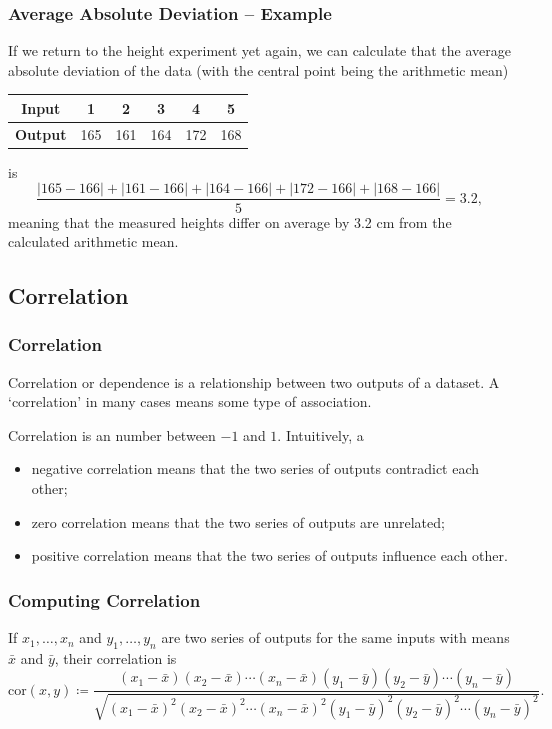 \documentclass[aspectratio=169,11pt,svgnames,handout]{beamer}
\begin{document}
\begin{frame}
 \frametitle{Average Absolute Deviation -- Example}
 If we return to the height experiment yet again, we can calculate that the
 average absolute deviation of the data (with the central point being the
 arithmetic mean)
 \begin{center}
  \begin{tabular}{c|ccccc}
   \textbf{Input} & 1 & 2 & 3 & 4 & 5\\
   \midrule
   \textbf{Output} & 165 & 161 & 164 & 172 & 168
  \end{tabular}
 \end{center}
 \pause
 is
 \[
  \frac{|165 - 166| + |161 - 166| + |164 - 166| + |172 - 166| + |168 - 166|}{5}
  = 3.2,
 \]
 \pause
 meaning that the measured heights differ on average by 3.2 cm from the
 calculated arithmetic mean.
\end{frame}

\subsection{Correlation}
\begin{frame}
 \frametitle{}
 \subsectionpage
\end{frame}

\begin{frame}
 \frametitle{Correlation}
 \begin{tcolorbox}[title=Correlation]
  \alert{Correlation} or \alert{dependence} is a relationship between two
  outputs of a dataset. A `correlation' in many cases means some type of
  association.
 \end{tcolorbox}
 \pause
 Correlation is an number between $-1$ and $1$.
 \pause
 Intuitively, a
 \begin{itemize}[label=\textbullet]
  \item negative correlation means that the two series of outputs
   \alert{contradict} each other;
  \pause
  \item zero correlation means that the two series of outputs are
   \alert{unrelated};
  \pause
  \item positive correlation means that the two series of outputs
   \alert{influence} each other.
 \end{itemize}
\end{frame}

\begin{frame}
 \frametitle{Computing Correlation}
 \begin{tcolorbox}[title=Correlation Formula]
  If $x_1,\ldots,x_n$ and $y_1,\ldots,y_n$ are two series of outputs for the
  same inputs with means $\bar{x}$ and $\bar{y}$, their correlation is
  \[
   \mathrm{cor}(x,y) \coloneqq \frac{(x_1-\bar{x})(x_2-\bar{x})\cdots
   (x_n-\bar{x})(y_1-\bar{y})(y_2-\bar{y})\cdots
  (y_n-\bar{y})}{\sqrt{(x_1-\bar{x})^2(x_2-\bar{x})^2\cdots
 (x_n-\bar{x})^2(y_1-\bar{y})^2(y_2-\bar{y})^2\cdots (y_n-\bar{y})^2}}.
  \]
 \end{tcolorbox}
\end{frame}
\end{document}
